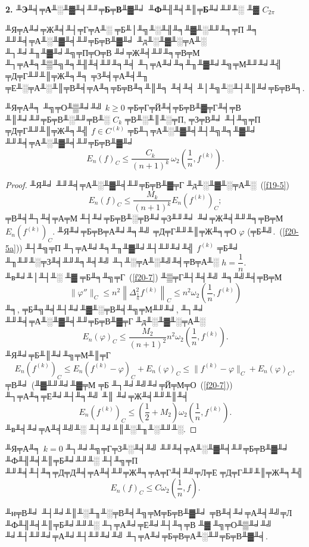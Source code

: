  \vspace{3mm}
 {\bf 2. ╨Э╨╡╤А╨░╨▓╨╡╨╜╤Б╤В╨▓╨╛ ╨Ф╨╢╨╡╨║╤Б╨╛╨╜╨░ ╨▓ ${C_{2\pi}}$}
 \vspace{3mm}

 ╨Я╤А╨╛╤Ж╨╡╨┤╤Г╤А╨░ ╤Б╨│╨╗╨░╨╢╨╕╨▓╨░╨╜╨╕╤П  ╨╕ ╨╜╨╡╤А╨░╨▓╨╡╨╜╤Б╤В╨▓╨╛ ╨д╨░╨▓╨░╤А╨░ ╨┐╨╛╨╖╨▓╨╛╨╗╤П╤О╤В
 ╨╛╤Ж╨╡╨╜╨╕╤В╤М ╨┐╤А╨╕╨▒╨╗╨╕╨╢╨╡╨╜╨╕╨╡ ╨┐╤А╨╛╨╕╨╖╨▓╨╛╨╗╤М╨╜╨╛╨╣ ╤Д╤Г╨╜╨║╤Ж╨╕╨╕ ╤З╨╡╤А╨╡╨╖ ╤Е╨░╤А╨░╨║╤В╨╡╤А╨╕╤Б╤В╨╕╨║╨╕ ╨╡╨╡ ╨│╨╗╨░╨┤╨║╨╛╤Б╤В╨╕.

 \begin{teo}[╨Ф.\,╨Ф╨╢╨╡╨║╤Б╨╛╨╜]
 ╨Я╤А╨╕ ╨╗╤О╨▒╨╛╨╝ $k\ge 0$ ╤Б╤Г╤Й╨╡╤Б╤В╨▓╤Г╨╡╤В ╨║╨╛╨╜╤Б╤В╨░╨╜╤В╨░ $C_k$ ╤В╨░╨║╨░╤П, ╤З╤В╨╛ ╨┤╨╗╤П ╤Д╤Г╨╜╨║╤Ж╨╕╨╣
 $f\in {C}^{(k)}$ ╤Б╨┐╤А╨░╨▓╨╡╨┤╨╗╨╕╨▓╨╛ ╨╜╨╡╤А╨░╨▓╨╡╨╜╤Б╤В╨▓╨╛
  $$
 E_n(f)_C\le \frac{C_k}{(n+1)^k}\, \omega_2\left(
 \frac{1}{n},f^{(k)}\right).
 $$
 \end{teo}

 \begin{proof} %
 ╨Я╨╛ ╨╜╨╡╤А╨░╨▓╨╡╨╜╤Б╤В╨▓╤Г ╨д╨░╨▓╨░╤А╨░~(\ref{f19-5})
 $$
 E_n(f)_C\le \frac{M_k}{(n+1)^k} E_n(f^{(k)})_C;
 $$
 ╤В╨╡╨┐╨╡╤А╤М ╨┤╨╛╤Б╤В╨░╤В╨╛╤З╨╜╨╛ ╨╛╤Ж╨╡╨╜╨╕╤В╤М $E_n(f^{(k)})_C.$ ╨Я╨╛╤Б╤В╤А╨╛╨╕╨╝  ╤Д╤Г╨╜╨║╤Ж╨╕╤О   $\varphi$  (╤Б╨╝.~(\ref{f20-5a}))
 ╨┤╨╗╤П ╨┐╤А╨╛╨╕╨╖╨▓╨╛╨┤╨╜╨╛╨╣ $f^{(k)}$ ╤Б╨╛ ╨╖╨╜╨░╤З╨╡╨╜╨╕╨╡╨╝ ╨┐╨░╤А╨░╨╝╨╡╤В╤А╨░  $h=\dfrac{1}{n}.$
 ╨в╨╛╨│╨┤╨░  ╨▓ ╤Б╨╕╨╗╤Г~(\ref{f20-7}) ╨▒╤Г╨┤╨╡╨╝ ╨╕╨╝╨╡╤В╤М
 $$
 \|\varphi''\|_C\le  n^2
 \left\| \Delta_{\frac{1}{n}}^2 f^{(k)}\right\|_C\le
  n^2\omega_2\left( \frac{1}{n},f^{(k)}\right)
 $$
 ╨╕, ╤Б╨╗╨╡╨┤╨╛╨▓╨░╤В╨╡╨╗╤М╨╜╨╛, ╨┐╨╛ ╨╜╨╡╤А╨░╨▓╨╡╨╜╤Б╤В╨▓╤Г ╨д╨░╨▓╨░╤А╨░
 $$
 E_n(\varphi)_C\le \frac{M_2}{(n+1)^2} n^2\omega_2
 \left( \frac{1}{n},f^{(k)}\right).
 $$
 ╨Я╨╛╤Б╨║╨╛╨╗╤М╨║╤Г
 $$
 E_n(f^{(k)})_C\le E_n(f^{(k)}-\varphi)_C+E_n(\varphi)_C\le \|f^{(k)}-\varphi\|_C+E_n(\varphi)_C,
 $$
 ╤В╨╛ (╨▓╨╜╨╛╨▓╤М ╤Б ╨┐╨╛╨╝╨╛╤Й╤М╤О~(\ref{f20-7})) ╨┐╤А╨╕╤Е╨╛╨┤╨╕╨╝ ╨║ ╨╛╤Ж╨╡╨╜╨║╨╡
  $$
 E_n(f^{(k)})_C\le \left(\frac{1}{2}+M_2\right) \omega_2
 \left( \frac{1}{n},f^{(k)}\right).
 $$
 ╨в╨╡╨╛╤А╨╡╨╝╨░ ╨┤╨╛╨║╨░╨╖╨░╨╜╨░.
 \end{proof}

 ╨Я╤А╨╕ $k=0$ ╨┐╨╛╨╗╤Г╤З╨░╨╡╨╝   ╨╜╨╡╤А╨░╨▓╨╡╨╜╤Б╤В╨▓╨╛ ╨Ф╨╢╨╡╨║╤Б╨╛╨╜╨░ ╨┤╨╗╤П ╨╜╨╡╨┤╨╕╤Д╤Д╨╡╤А╨╡╨╜╤Ж╨╕╤А╤Г╨╡╨╝╤Л╤Е ╤Д╤Г╨╜╨║╤Ж╨╕╨╣
 $$
 E_n(f)_C\le C\omega_2\left( \frac{1}{n},f\right).
 $$

 \begin{Remark} %
 ╨н╤В╨╛ ╨┤╨╛╨║╨░╨╖╨░╤В╨╡╨╗╤М╤Б╤В╨▓╨╛ ╤В╨╡╨╛╤А╨╡╨╝╤Л ╨Ф╨╢╨╡╨║╤Б╨╛╨╜╨░ ╨┐╤А╨╛╤Е╨╛╨┤╨╕╤В ╨▓ ╨╗╤О╨▒╨╛╨╝ ╨╛╨┤╨╜╨╛╤А╨╛╨┤╨╜╨╛╨╝ ╨┐╤А╨╛╤Б╤В╤А╨░╨╜╤Б╤В╨▓╨╡.
 \end{Remark}
